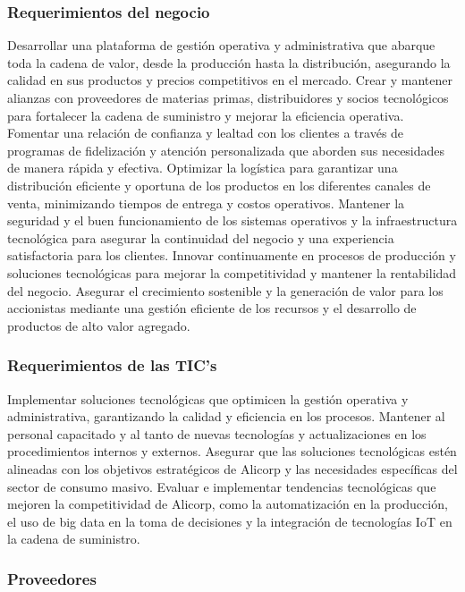     \subsubsection{Requerimientos del negocio}
    Desarrollar una plataforma de gestión operativa y administrativa que abarque toda la cadena de valor, desde la producción hasta la distribución, asegurando la calidad en sus productos y precios competitivos en el mercado. 
    Crear y mantener alianzas con proveedores de materias primas, distribuidores y socios tecnológicos para fortalecer la cadena de suministro y mejorar la eficiencia operativa. 
    Fomentar una relación de confianza y lealtad con los clientes a través de programas de fidelización y atención personalizada que aborden sus necesidades de manera rápida y efectiva. 
    Optimizar la logística para garantizar una distribución eficiente y oportuna de los productos en los diferentes canales de venta, minimizando tiempos de entrega y costos operativos. 
    Mantener la seguridad y el buen funcionamiento de los sistemas operativos y la infraestructura tecnológica para asegurar la continuidad del negocio y una experiencia satisfactoria para los clientes. 
    Innovar continuamente en procesos de producción y soluciones tecnológicas para mejorar la competitividad y mantener la rentabilidad del negocio. 
    Asegurar el crecimiento sostenible y la generación de valor para los accionistas mediante una gestión eficiente de los recursos y el desarrollo de productos de alto valor agregado. 

    \subsubsection{Requerimientos de las TIC’s}
    Implementar soluciones tecnológicas que optimicen la gestión operativa y administrativa, garantizando la calidad y eficiencia en los procesos. 
    Mantener al personal capacitado y al tanto de nuevas tecnologías y actualizaciones en los procedimientos internos y externos. 
    Asegurar que las soluciones tecnológicas estén alineadas con los objetivos estratégicos de Alicorp y las necesidades específicas del sector de consumo masivo. 
    Evaluar e implementar tendencias tecnológicas que mejoren la competitividad de Alicorp, como la automatización en la producción, el uso de big data en la toma de decisiones y la integración de tecnologías IoT en la cadena de suministro. 
    
    \subsubsection{Proveedores }
